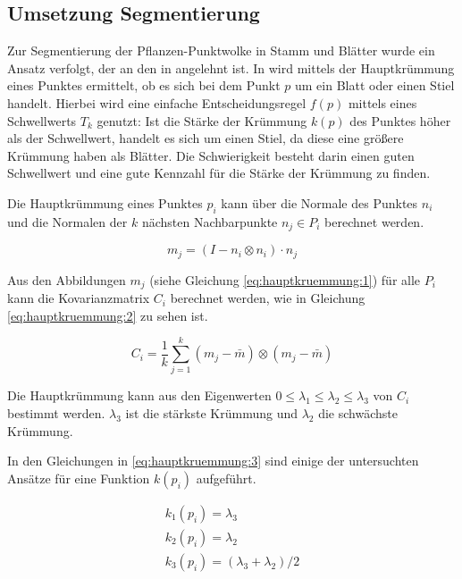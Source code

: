 \documentclass[12pt,titlepage, twoside]{article}
\begin{document}
\subsection{Umsetzung Segmentierung}
\label{sec:realisierung:implementierung3}

Zur Segmentierung der Pflanzen-Punktwolke in Stamm und Blätter wurde ein Ansatz verfolgt, der an den in \cite{ThreeBasics} angelehnt ist.
In \cite{ThreeBasics} wird mittels der Hauptkrümmung eines Punktes ermittelt, ob es sich bei dem Punkt $p$ um ein Blatt oder einen Stiel handelt. 
Hierbei wird eine einfache Entscheidungsregel $f(p)$ mittels eines Schwellwerts $T_k$ genutzt: 
Ist die Stärke der Krümmung $k(p)$ des Punktes höher als der Schwellwert, handelt es sich um einen Stiel, da diese eine größere Krümmung haben als Blätter.
Die Schwierigkeit besteht darin einen guten Schwellwert und eine gute Kennzahl für die Stärke der Krümmung zu finden.

Die Hauptkrümmung eines Punktes $p_i$ kann über die Normale des Punktes $n_i$ und die Normalen der $k$ nächsten Nachbarpunkte $n_j \in P_i$ berechnet werden.

\begin{equation}
\label{eq:hauptkruemmung:1}
m_j = (I - n_i \otimes n_i ) \cdot n_j
\end{equation}

Aus den Abbildungen $m_j$ (siehe Gleichung \ref{eq:hauptkruemmung:1}) für alle $P_i$ kann die Kovarianzmatrix $C_i$ berechnet werden, wie in Gleichung \ref{eq:hauptkruemmung:2} zu sehen ist.

\begin{equation}
\label{eq:hauptkruemmung:2}
C_i = \frac{1}{k} \sum_{j=1}^k{(m_j - \bar{m}) \otimes (m_j - \bar{m})}
\end{equation}

Die Hauptkrümmung kann aus den Eigenwerten $0 \leq \lambda_1 \leq \lambda_2 \leq \lambda_3$ von $C_i$ bestimmt werden. $\lambda_3$ ist die stärkste Krümmung und $\lambda_2$ die schwächste Krümmung.

In den Gleichungen in \ref{eq:hauptkruemmung:3} sind einige der untersuchten Ansätze für eine Funktion $k(p_i)$ aufgeführt. 

\begin{equation}
\label{eq:hauptkruemmung:3}
\begin{array}{ll}
k_1(p_i) = \lambda_3 \\
k_2(p_i) = \lambda_2 \\
k_3(p_i) = (\lambda_3 + \lambda_2) / 2 
\end{array}{}
\end{equation}
\end{document}
